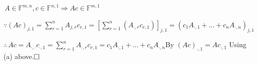 \documentclass[a4paper, 11pt, UTF8]{article}
\def\Fbb{{\mathbb{F}}}
\def\BulletPoint{{\small\bullet}}
\def\Or{{\large O{\footnotesize R.} }}
\begin{document}
\begin{large}
\SepLine\par

\BulletPoint \,\quad $A\in\Fbb^{m,n},c\in\Fbb^{n,1}\Rightarrow Ac\in\Fbb^{m,1}$\par\quad
$\because(Ac)_{j,1}=\sum\limits_{r=1}^n A_{j,r}c_{r,1}=[\sum\limits_{r=1}^n(A_{\cdot,r}c_{r,1})]_{j,1}=(c_1 A_{\cdot,1}+\dots+c_n A_{\cdot,n})_{j,1}$\par\quad
$\therefore\,Ac=A_{\cdot,\cdot}c_{\cdot,1}=\sum\limits_{r=1}^n A_{\cdot,r}c_{r,1}=c_1 A_{\cdot,1}+\dots+c_n A_{\cdot,n}$\quad \Or By $(Ac)_{\cdot,1}=Ac_{\cdot,1}$ Using (a) above.$\hfill\square$\vspace{2pt}\par
\SepLine\par


\end{large}
\end{document}

